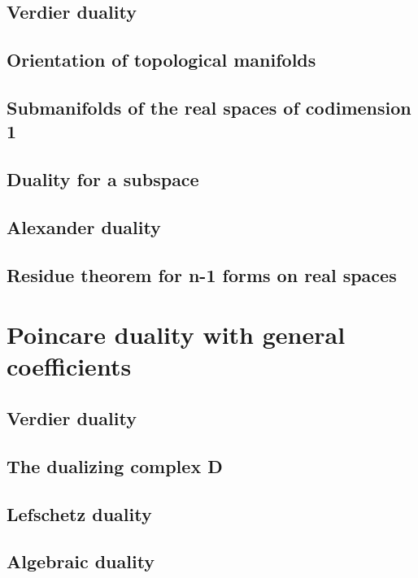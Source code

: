\documentclass[5pt]{article}
\theoremstyle{definition}
\theoremstyle{remark}
\begin{document}
	\subsection{Verdier duality}
	
	\subsection{Orientation of topological manifolds}
	
	\subsection{Submanifolds of the real spaces of codimension 1}
	
	\subsection{Duality for a subspace}
	
	\subsection{Alexander duality}
	
	\subsection{Residue theorem for n-1 forms on real spaces}	
	
	\newpage 
	
	\section{Poincare duality with general coefficients}
	
	\subsection{Verdier duality}
	
	\subsection{The dualizing complex D}
	
	\subsection{Lefschetz duality}
	
	\subsection{Algebraic duality}
	
\end{document}
